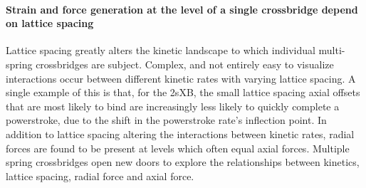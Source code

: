 \documentclass[]{article}
\begin{document}



\paragraph{Strain and force generation at the level of a single crossbridge depend on lattice spacing} %
Lattice spacing greatly alters the kinetic landscape to which individual multi-spring crossbridges are subject.
Complex, and not entirely easy to visualize interactions occur between different kinetic rates with varying lattice spacing. 
A single example of this is that, for the 2sXB, the small lattice spacing axial offsets that are most likely to bind are increasingly less likely to quickly complete a powerstroke, due to the shift in the powerstroke rate's inflection point.
In addition to lattice spacing altering the interactions between kinetic rates, radial forces are found to be present at levels which often equal axial forces. 
Multiple spring crossbridges open new doors to explore the relationships between kinetics, lattice spacing, radial force and axial force.

\end{document}
